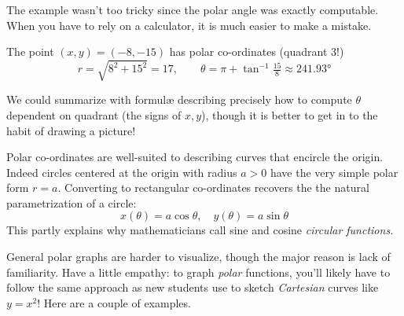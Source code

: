 The example wasn't too tricky since the polar angle was exactly computable. When you have to rely on a calculator, it is much easier to make a mistake.

\begin{example}{}{}
	The point $(x,y)=(-8,-15)$ has polar co-ordinates (quadrant 3!)
	\[
		r=\sqrt{8^2+15^2}=17,\qquad 
		\theta=\pi+\tan^{-1}\tfrac{15}8 \approx \ang{241.93}
	\]
\end{example}


We could summarize with formulæ describing precisely how to compute $\theta$ dependent on quadrant (the signs of $x,y$), though it is better to get in to the habit of drawing a picture!

\goodbreak



Polar co-ordinates are well-suited to describing curves that encircle the origin. Indeed circles centered at the origin with radius $a>0$ have the very simple polar form $r=a$. Converting to rectangular co-ordinates recovers the the natural parametrization of a circle:
\[
	x(\theta)=a\cos\theta,\quad 
	y(\theta)=a\sin\theta
\]
This partly explains why mathematicians call sine and cosine \emph{circular functions.}\smallbreak

General polar graphs are harder to visualize, though the major reason is lack of familiarity. Have a little empathy: to graph \emph{polar} functions, you'll likely have to follow the same approach as new students use to sketch \emph{Cartesian} curves like $y=x^2$! Here are a couple of examples.

